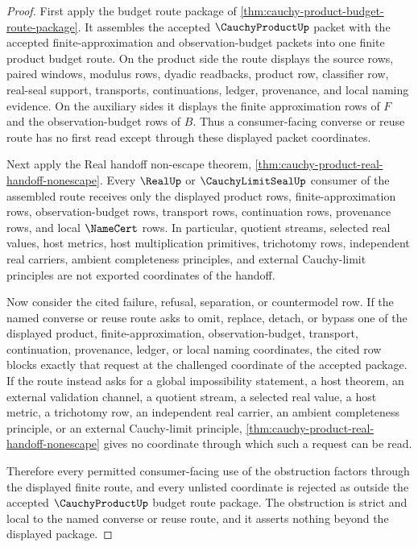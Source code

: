 \begin{proof}
First apply the budget route package of \autoref{thm:cauchy-product-budget-route-package}. It assembles the accepted $\CauchyProductUp$ packet with the accepted finite-approximation and observation-budget packets into one finite product budget route. On the product side the route displays the source rows, paired windows, modulus rows, dyadic readbacks, product row, classifier row, real-seal support, transports, continuations, ledger, provenance, and local naming evidence. On the auxiliary sides it displays the finite approximation rows of $F$ and the observation-budget rows of $B$. Thus a consumer-facing converse or reuse route has no first read except through these displayed packet coordinates.

Next apply the Real handoff non-escape theorem, \autoref{thm:cauchy-product-real-handoff-nonescape}. Every $\RealUp$ or $\CauchyLimitSealUp$ consumer of the assembled route receives only the displayed product rows, finite-approximation rows, observation-budget rows, transport rows, continuation rows, provenance rows, and local $\NameCert$ rows. In particular, quotient streams, selected real values, host metrics, host multiplication primitives, trichotomy rows, independent real carriers, ambient completeness principles, and external Cauchy-limit principles are not exported coordinates of the handoff.

Now consider the cited failure, refusal, separation, or countermodel row. If the named converse or reuse route asks to omit, replace, detach, or bypass one of the displayed product, finite-approximation, observation-budget, transport, continuation, provenance, ledger, or local naming coordinates, the cited row blocks exactly that request at the challenged coordinate of the accepted package. If the route instead asks for a global impossibility statement, a host theorem, an external validation channel, a quotient stream, a selected real value, a host metric, a trichotomy row, an independent real carrier, an ambient completeness principle, or an external Cauchy-limit principle, \autoref{thm:cauchy-product-real-handoff-nonescape} gives no coordinate through which such a request can be read.

Therefore every permitted consumer-facing use of the obstruction factors through the displayed finite route, and every unlisted coordinate is rejected as outside the accepted $\CauchyProductUp$ budget route package. The obstruction is strict and local to the named converse or reuse route, and it asserts nothing beyond the displayed package.
\end{proof}
